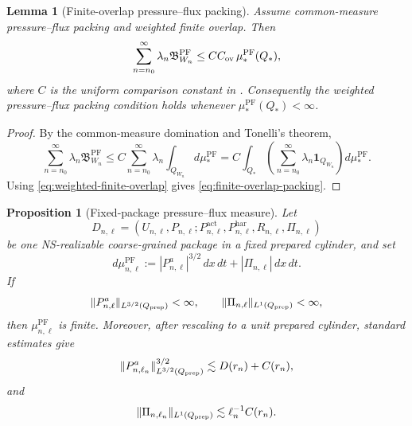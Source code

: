 \documentclass[11pt]{article}
\numberwithin{equation}{section}
\theoremstyle{plain}
\newtheorem{proposition}[theorem]{Proposition}
\newtheorem{lemma}[theorem]{Lemma}
\theoremstyle{definition}
\theoremstyle{remark}
\newcommand{\PF}{\mathrm{PF}}
\newcommand{\har}{\mathrm{har}}
\newcommand{\bfB}{\mathfrak B}
\newcommand{\act}{\mathrm{act}}
\begin{document}
\begin{lemma}[Finite-overlap pressure--flux packing]
\label{lem:finite-overlap-pf-packing}
Assume common-measure pressure--flux packing and weighted finite overlap.  Then
\begin{equation}
        \sum_{n=n_0}^{\infty}\lambda_n\bfB^{\PF}_{W_n}
        \le
        C C_{\rm ov}\,\mu_*^{\PF}(Q_*),
        \label{eq:finite-overlap-packing}
\end{equation}
where \(C\) is the uniform comparison constant in
.  Consequently the weighted
pressure--flux packing condition holds whenever \(\mu_*^{\PF}(Q_*)<\infty\).
\end{lemma}

\begin{proof}
By the common-measure domination and Tonelli's theorem,
\[
        \sum_{n=n_0}^{\infty}\lambda_n\bfB^{\PF}_{W_n}
        \le
        C
        \sum_{n=n_0}^{\infty}\lambda_n
        \int_{Q_{W_n}}d\mu_*^{\PF}
        =
        C
        \int_{Q_*}
        \left(\sum_{n=n_0}^{\infty}\lambda_n\mathbf 1_{Q_{W_n}}\right)
        d\mu_*^{\PF}.
\]
Using \eqref{eq:weighted-finite-overlap} gives \eqref{eq:finite-overlap-packing}.
\end{proof}

\begin{proposition}[Fixed-package pressure--flux measure]
\label{prop:pf-measure-finite}
Let
\[
        D_{n,\ell}=(U_{n,\ell},P_{n,\ell};P^{\act}_{n,\ell},P^{\har}_{n,\ell},R_{n,\ell},\Pi_{n,\ell})
\]
be one NS-realizable coarse-grained package in a fixed prepared cylinder, and set
\[
        d\mu_{n,\ell}^{\PF}
        :=
        |P^a_{n,\ell}|^{3/2}\,dx\,dt+|\Pi_{n,\ell}|\,dx\,dt .
\]
If
\[
        \|P^a_{n,\ell}\|_{L^{3/2}(Q_{\rm prep})}<\infty,
        \qquad
        \|\Pi_{n,\ell}\|_{L^1(Q_{\rm prep})}<\infty,
\]
then \(\mu_{n,\ell}^{\PF}\) is finite.  Moreover, after rescaling to a unit
prepared cylinder, standard estimates give
\begin{equation}
        \|P^a_{n,\ell_n}\|_{L^{3/2}(Q_{\rm prep})}^{3/2}
        \lesssim
        D(r_n)+C(r_n),
        \label{eq:pressure-measure-finite}
\end{equation}
and
\begin{equation}
        \|\Pi_{n,\ell_n}\|_{L^1(Q_{\rm prep})}
        \lesssim
        \ell_n^{-1}C(r_n).
        \label{eq:flux-measure-finite}
\end{equation}
\end{proposition}
\end{document}
